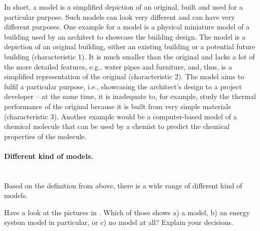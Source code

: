 In short, a model is a simplified depiction of an original, built and used for a particular purpose. Such models can look very different and can have very different purposes. One example for a model is a physical miniature model of a building used by an architect to showcase the building design. The model is a depiction of an original building, either an existing building or a potential future building (characteristic 1). It is much smaller than the original and lacks a lot of the more detailed features, e.g., water pipes and furniture, and, thus, is a simplified representation of the original (characteristic 2). The model aims to fulfil a particular purpose, i.e., showcasing the architect's design to a project developer -- at the same time, it is inadequate to, for example, study the thermal performance of the original because it is built from very simple materials (characteristic 3). Another example would be a computer-based model of a chemical molecule that can be used by a chemist to predict the chemical properties of the molecule.


\paragraph*{Different kind of models.}~\\

Based on the definition from above, there is a wide range of different kind of models.

\begin{kaobox}[frametitle=Task]
Have a look at the pictures in . Which of those shows a) a model, b) an energy system model in particular, or c) no model at all? Explain your decisions.
\end{kaobox}

